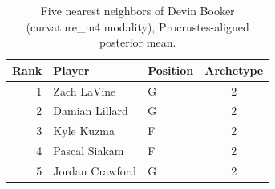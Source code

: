 \begin{table}[htbp]
  \centering\small
  \begin{tabular}{rllc}
    \toprule
    Rank & Player & Position & Archetype \\
    \midrule
    1 & Zach LaVine & G & 2 \\
    2 & Damian Lillard & G & 2 \\
    3 & Kyle Kuzma & F & 2 \\
    4 & Pascal Siakam & F & 2 \\
    5 & Jordan Crawford & G & 2 \\
    \bottomrule
  \end{tabular}
  \caption{Five nearest neighbors of Devin Booker (curvature_m4 modality), Procrustes-aligned posterior mean.}
  \label{tab:Devin_Booker_neighbors_curvature_m4}
\end{table}

